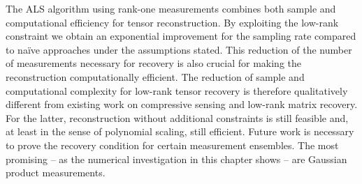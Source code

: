 The ALS algorithm using rank-one measurements combines both sample and computational efficiency for tensor reconstruction.
By exploiting the low-rank constraint we obtain an exponential improvement for the sampling rate compared to na\"ive approaches under the assumptions stated.
This reduction of the number of measurements necessary for recovery is also crucial for making the reconstruction computationally efficient.
The reduction of sample and computational complexity for low-rank tensor recovery is therefore qualitatively different from existing work on compressive sensing and low-rank matrix recovery.
For the latter, reconstruction without additional constraints is still feasible and, at least in the sense of polynomial scaling, still efficient.
Future work is necessary to prove the recovery condition for certain measurement ensembles.
The most promising -- as the numerical investigation in this chapter shows -- are Gaussian product measurements.
